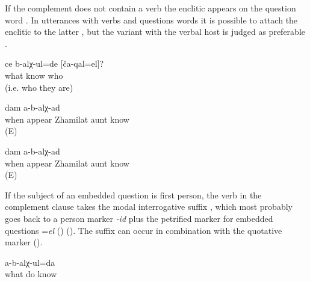 If the complement does not contain a verb the enclitic appears on the question word . In utterances with verbs and questions words it is possible to attach the enclitic to the latter , but the variant with the verbal host is judged as preferable .
%
\begin{exe}
	\ex	\label{ex:How do you know them}
	\gll	ce	b-alχ-ul=de	[ča-qal=el]?\\
		what	know	who\\
	\glt	{} (i.e. who they are)

	\ex	\label{ex:‎I don't know when aunt Zhamilat was bornA}
	\gll	[ceqːel=el	hak'-ub-ce	žamilat	azi]	dam	a-b-alχ-ad\\
		when	appear	Zhamilat	aunt		know\\
	\glt	{} (E)

	\ex	\label{ex:‎I don't know when aunt Zhamilat was bornB}
	\gll	[ceqːel	hak'-ub-ce=jal	žamilat	azi]	dam	a-b-alχ-ad\\
		when	appear	Zhamilat	aunt		know\\
	\glt	{} (E)
\end{exe}

If the subject of an embedded question is first person, the verb in the complement clause takes the modal interrogative suffix , which most probably goes back to a person marker \textit{-id} plus the petrified marker for embedded questions =\textit{el} () (). The suffix can occur in combination with the quotative marker ().
%
\begin{exe}
	\ex	\label{ex:I do not know what to do}
	\gll	[ce	b-arq'-ide=l]	a-b-alχ-ul=da\\
		what	do	know\\
	\glt	{}
\end{exe}



